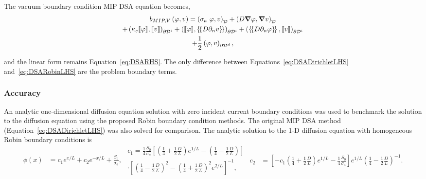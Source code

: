 \documentclass[12pt]{article}
\begin{document}
\noindent The vacuum boundary condition MIP DSA equation becomes,
\begin{multline}
b_{MIP,V} \left(\varphi, v \right) = \left(\sigma_a\ \varphi, v \right)_\mathcal{D} + \left(D \bm{\nabla} \varphi, \bm{\nabla} v \right)_\mathcal{D} \\
+ \left( \kappa_e \llbracket \varphi \rrbracket, \llbracket v \rrbracket \right)_{\partial \mathcal{D}^i}
+ \left( \llbracket \varphi \rrbracket , \left\{\!\left\{ D \partial_n v \right\} \! \right\} \right)_{\partial \mathcal{D}^i} + \left( \left\{ \! \left\{ D \partial_n \varphi \right\} \! \right\} , \llbracket v \rrbracket \right)_{\partial \mathcal{D}^i} \\
+ \frac{1}{2} \left(\varphi, v \right)_{\partial \mathcal{D}^d},
\label{eq:DSARobinLHS}
\end{multline}

\noindent and the linear form remains Equation~\ref{eq:DSARHS}. The only difference between Equations~\ref{eq:DSADirichletLHS} and~\ref{eq:DSARobinLHS} are the problem boundary terms.


\subsubsection{Accuracy}
\label{sec:MIPDSARobinBCAccuracy}
An analytic one-dimensional diffusion equation solution with zero incident current boundary conditions was used to benchmark the solution to the diffusion equation using the proposed Robin boundary condition methods. The original MIP DSA method (Equation~\ref{eq:DSADirichletLHS}) was also solved for comparison. The analytic solution to the 1-D diffusion equation with homogeneous Robin boundary conditions is
\begin{subequations}
\begin{flalign}
\phi \left(x \right) & = c_1 e^{x/L} + c_2 e^{-x/L} + \frac{S_0}{\sigma_a},
\end{flalign}
\begin{multline}
c_1 = \frac{1}{4} \frac{S_0}{\sigma_a} \left[ \left(\frac{1}{4} + \frac{1}{2} \frac{D}{L} \right) e^{1/L} - \left(\frac{1}{4} - \frac{1}{2} \frac{D}{L} \right) \right] \\
\cdot \left[\left(\frac{1}{4} - \frac{1}{2} \frac{D}{L} \right)^2 - \left(\frac{1}{4} + \frac{1}{2} \frac{D}{L} \right)^2 e^{2/L} \right]^{-1},
\end{multline}
\begin{flalign}
c_2 & = \left[-c_1 \left(\frac{1}{4} + \frac{1}{2} \frac{D}{L} \right) e^{1/L} - \frac{1}{4} \frac{S_0}{\sigma_a} \right] e^{1/L} \left(\frac{1}{4} - \frac{1}{2} \frac{D}{L} \right)^{-1}.
\end{flalign}
\end{subequations}
\end{document}
